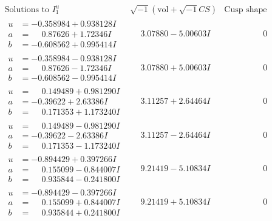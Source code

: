 \documentclass[1p]{elsarticle_modified}
\theoremstyle{definition}
\newcommand{\I}{\sqrt{-1}}
\begin{document}
$$\begin{array}{c|c|c}  
\text{Solutions to }I^u_{1}& \I (\text{vol} + \sqrt{-1}CS) & \text{Cusp shape}\\
 \hline 
\begin{aligned}
u &= -0.358984 + 0.938128 I \\
a &= \phantom{-}0.87626 + 1.72346 I \\
b &= -0.608562 + 0.995414 I\end{aligned}
 & \phantom{-}3.07880 - 5.00603 I & \phantom{-0.000000 } 0 \\ \hline\begin{aligned}
u &= -0.358984 - 0.938128 I \\
a &= \phantom{-}0.87626 - 1.72346 I \\
b &= -0.608562 - 0.995414 I\end{aligned}
 & \phantom{-}3.07880 + 5.00603 I & \phantom{-0.000000 } 0 \\ \hline\begin{aligned}
u &= \phantom{-}0.149489 + 0.981290 I \\
a &= -0.39622 + 2.63386 I \\
b &= \phantom{-}0.171353 + 1.173240 I\end{aligned}
 & \phantom{-}3.11257 + 2.64464 I & \phantom{-0.000000 } 0 \\ \hline\begin{aligned}
u &= \phantom{-}0.149489 - 0.981290 I \\
a &= -0.39622 - 2.63386 I \\
b &= \phantom{-}0.171353 - 1.173240 I\end{aligned}
 & \phantom{-}3.11257 - 2.64464 I & \phantom{-0.000000 } 0 \\ \hline\begin{aligned}
u &= -0.894429 + 0.397266 I \\
a &= \phantom{-}0.155099 - 0.844007 I \\
b &= \phantom{-}0.935844 - 0.241800 I\end{aligned}
 & \phantom{-}9.21419 - 5.10834 I & \phantom{-0.000000 } 0 \\ \hline\begin{aligned}
u &= -0.894429 - 0.397266 I \\
a &= \phantom{-}0.155099 + 0.844007 I \\
b &= \phantom{-}0.935844 + 0.241800 I\end{aligned}
 & \phantom{-}9.21419 + 5.10834 I & \phantom{-0.000000 } 0 \\ \hline\begin{aligned}

\end{aligned}
\end{array}$$
\end{document}
